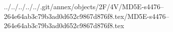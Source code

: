 ../../../../../.git/annex/objects/2F/4V/MD5E-s4476--264e64ab3c79b3ad0d652c9867d876f8.tex/MD5E-s4476--264e64ab3c79b3ad0d652c9867d876f8.tex